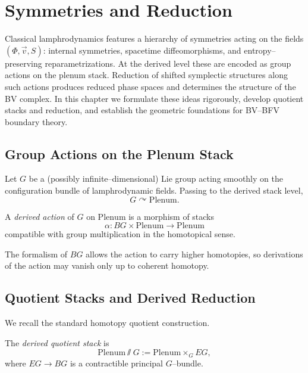 \chapter{Symmetries and Reduction}
\label{ch:symmetries-reduction}

Classical lamphrodynamics features a hierarchy of symmetries acting on
the fields $(\Phi,\vec v,S)$: internal symmetries, spacetime
diffeomorphisms, and entropy--preserving reparametrizations.
At the derived level these are encoded as group actions on the plenum
stack.  Reduction of shifted symplectic structures along such actions
produces reduced phase spaces and determines the structure of the BV
complex.  In this chapter we formulate these ideas rigorously, develop
quotient stacks and reduction, and establish the geometric foundations
for BV--BFV boundary theory.



\section{Group Actions on the Plenum Stack}
\label{sec:group-actions}

Let $G$ be a (possibly infinite--dimensional) Lie group acting smoothly
on the configuration bundle of lamphrodynamic fields.
Passing to the derived stack level,
\[
G\curvearrowright\mathrm{Plenum}.
\]

\begin{definition}
A \emph{derived action} of $G$ on $\mathrm{Plenum}$
is a morphism of stacks
\[
\alpha\colon B G\times \mathrm{Plenum} \longrightarrow \mathrm{Plenum}
\]
compatible with group multiplication in the homotopical sense.
\end{definition}

\begin{remark}
The formalism of $BG$ allows the action to carry higher homotopies, so
derivations of the action may vanish only up to coherent homotopy.
\end{remark}



\section{Quotient Stacks and Derived Reduction}
\label{sec:quotients}

We recall the standard homotopy quotient construction.

\begin{definition}
The \emph{derived quotient stack} is
\[
\mathrm{Plenum}\sslash G :=
\mathrm{Plenum}\times_{G} EG,
\]
where $EG\to BG$ is a contractible principal $G$--bundle.
\end{definition}

